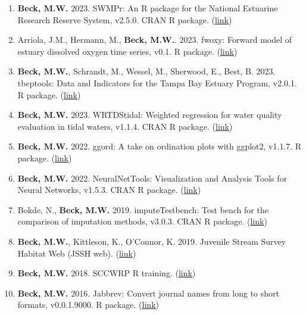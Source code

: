 \documentclass[letterpaper,12pt]{article}
\begin{document}
\begin{enumerate}
\item \textbf{Beck, M.W.} 2023. SWMPr: An R package for the National Estuarine Research Reserve System, v2.5.0. CRAN R package. ({\footnotesize\href{http://fawda123.github.io/SWMPr}{link}})

\item Arriola, J.M., Hermann, M., \textbf{Beck, M.W.}. 2023. fwoxy: Forward model of estuary dissolved oxygen time series, v0.1. R package. ({\footnotesize\href{https://github.com/jmarriola/fwoxy}{link}}) 

\item \textbf{Beck, M.W.}, Schrandt, M., Wessel, M., Sherwood, E., Best, B. 2023. tbeptools: Data and Indicators for the Tampa Bay Estuary Program, v2.0.1. R package. ({\footnotesize\href{https://tbep-tech.github.io/tbeptools/}{link}})

\item \textbf{Beck, M.W.} 2023. WRTDStidal: Weighted regression for water quality evaluation in tidal waters, v1.1.4. CRAN R package. ({\footnotesize\href{https://cran.r-project.org/web/packages/WRTDStidal/index.html}{link}})

\item \textbf{Beck, M.W.} 2022. ggord: A take on ordination plots with ggplot2, v1.1.7. R package. ({\footnotesize\href{https://fawda123.github.io/ggord/}{link}})

\item \textbf{Beck, M.W.} 2022. NeuralNetTools: Visualization and Analysis Tools for Neural Networks, v1.5.3. CRAN R package. ({\footnotesize\href{http://cran.r-project.org/web/packages/NeuralNetTools/}{link}})

\item Bokde, N., \textbf{Beck, M.W.} 2019. imputeTestbench: Test bench for the comparison of imputation methods, v3.0.3. CRAN R package. ({\footnotesize\href{https://cran.r-project.org/web/packages/imputeTestbench/index.html}{link}})

\item \textbf{Beck, M.W.}, Kittleson, K., O'Connor, K. 2019. Juvenile Stream Survey Habitat Web (JSSH web). ({\footnotesize\href{https://sccwrp.shinyapps.io/jssh_web/}{link}})

\item \textbf{Beck, M.W.} 2018. SCCWRP R training. ({\footnotesize\href{https://sccwrp.github.io/SCCWRP_R_training/}{link}})

\item \textbf{Beck, M.W.} 2016. Jabbrev: Convert journal names from long to short formats, v0.0.1.9000. R package. ({\footnotesize\href{https://github.com/fawda123/Jabbrev}{link}})


\end{enumerate}
\end{document}
